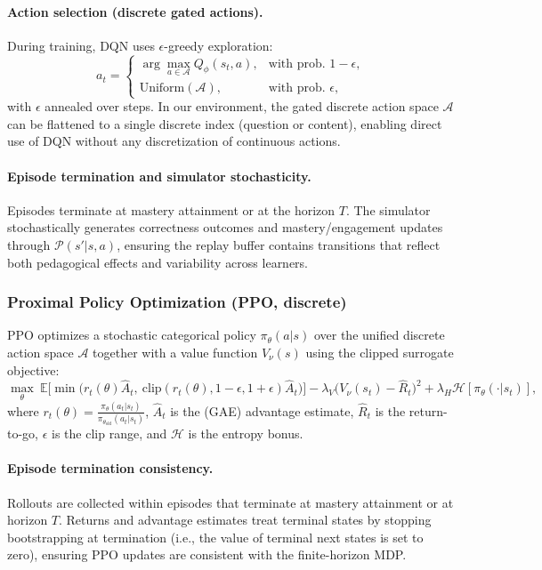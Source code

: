 \documentclass[preprint,12pt]{elsarticle}
\begin{document}
\begin{frontmatter}
\paragraph{Action selection (discrete gated actions).}
During training, DQN uses $\epsilon$-greedy exploration:
\[
a_t=
\begin{cases}
\arg\max_{a\in\mathcal{A}} Q_\phi(s_t,a), & \text{with prob. } 1-\epsilon,\\
\text{Uniform}(\mathcal{A}), & \text{with prob. } \epsilon,
\end{cases}
\]
with $\epsilon$ annealed over steps. In our environment, the gated discrete action space $\mathcal{A}$ can be flattened to a single discrete index (question or content), enabling direct use of DQN without any discretization of continuous actions.

\paragraph{Episode termination and simulator stochasticity.}
Episodes terminate at mastery attainment or at the horizon $T$. The simulator stochastically generates correctness outcomes and mastery/engagement updates through $\mathcal{P}(s'|s,a)$, ensuring the replay buffer contains transitions that reflect both pedagogical effects and variability across learners.

\subsubsection{Proximal Policy Optimization (PPO, discrete)}
\label{subsubsec:ppo_discrete}
PPO optimizes a stochastic categorical policy $\pi_\theta(a|s)$ over the unified discrete action space $\mathcal{A}$ together with a value function $V_\nu(s)$ using the clipped surrogate objective:
\[
\max_{\theta}\ \mathbb{E}\Big[
\min\big(r_t(\theta)\hat{A}_t,\ \mathrm{clip}(r_t(\theta),1-\epsilon,1+\epsilon)\hat{A}_t\big)
\Big]
-\lambda_V\big(V_\nu(s_t)-\hat{R}_t\big)^2
+\lambda_H \mathcal{H}[\pi_\theta(\cdot|s_t)],
\]
where $r_t(\theta)=\frac{\pi_\theta(a_t|s_t)}{\pi_{\theta_{\text{old}}}(a_t|s_t)}$, $\hat{A}_t$ is the (GAE) advantage estimate, $\hat{R}_t$ is the return-to-go, $\epsilon$ is the clip range, and $\mathcal{H}$ is the entropy bonus.

\paragraph{Episode termination consistency.}
Rollouts are collected within episodes that terminate at mastery attainment or at horizon $T$. Returns and advantage estimates treat terminal states by stopping bootstrapping at termination (i.e., the value of terminal next states is set to zero), ensuring PPO updates are consistent with the finite-horizon MDP.


\end{frontmatter}
\end{document}
